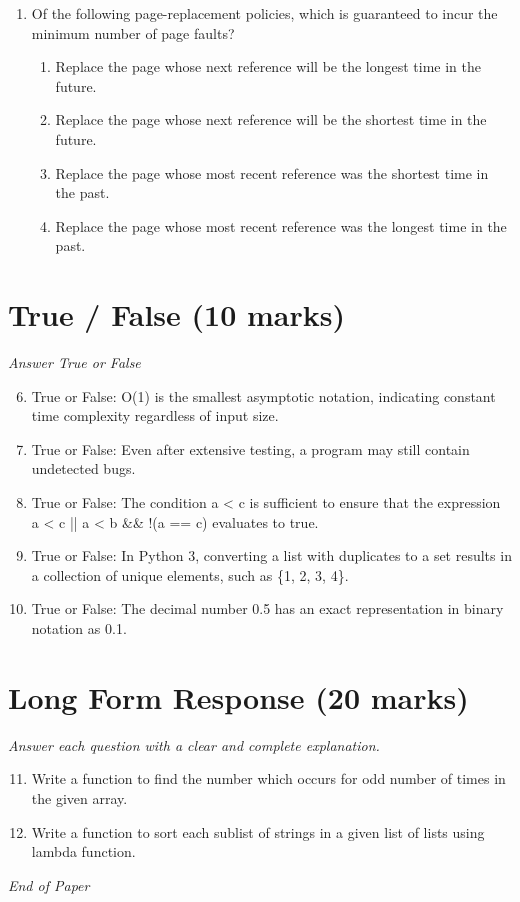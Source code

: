 \documentclass[12pt]{article}
\begin{document}
\begin{enumerate}[label=\arabic*.]
\begin{enumerate}[label=(\alph*)]
    \item To determine the hardware address of a given IP address
\end{enumerate}
\item Of the following page-replacement policies, which is guaranteed to incur the minimum number of page faults?
\begin{enumerate}[label=(\alph*)]
    \item Replace the page whose next reference will be the longest time in the future.
    \item Replace the page whose next reference will be the shortest time in the future.
    \item Replace the page whose most recent reference was the shortest time in the past.
    \item Replace the page whose most recent reference was the longest time in the past.
\end{enumerate}
\end{enumerate}

\section*{True / False (10 marks)}
\textit{Answer True or False}
\begin{enumerate}[label=\arabic*.]
\setcounter{enumi}{5}
\item True or False: O(1) is the smallest asymptotic notation, indicating constant time complexity regardless of input size.
\item True or False: Even after extensive testing, a program may still contain undetected bugs.
\item True or False: The condition a \textless{} c is sufficient to ensure that the expression a \textless{} c || a \textless{} b \&\& !(a == c) evaluates to true.
\item True or False: In Python 3, converting a list with duplicates to a set results in a collection of unique elements, such as \{1, 2, 3, 4\}.
\item True or False: The decimal number 0.5 has an exact representation in binary notation as 0.1.
\end{enumerate}

\section*{Long Form Response (20 marks)}
\textit{Answer each question with a clear and complete explanation.}
\begin{enumerate}[label=\arabic*.]
\setcounter{enumi}{10}
\item Write a function to find the number which occurs for odd number of times in the given array.
\item Write a function to sort each sublist of strings in a given list of lists using lambda function.
\end{enumerate}

\vfill
\noindent\textit{End of Paper}
\end{document}
